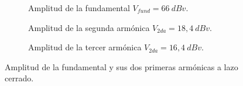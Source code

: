       \begin{figure}[H]
        \centering
        \begin{subfigure}[H]{0.48\textwidth}
          \caption{Amplitud de la fundamental $V_{fund}=66~dBv$.}
          \label{fig:Exp7AmpFundamentalLC}
        \end{subfigure}
        \hfill 
        \begin{subfigure}[H]{0.48\textwidth}
          \caption{Amplitud de la segunda armónica $V_{2da}=18,4~dBv$.}
          \label{fig:Exp7AmpSegundaLC}
        \end{subfigure}     
        \begin{subfigure}[H]{0.48\textwidth}
          \caption{Amplitud de la tercer armónica $V_{2da}=16,4~dBv$.}
          \label{fig:Exp7AmpTercerLC}
        \end{subfigure}   
        \caption{Amplitud de la fundamental y sus dos primeras armónicas a lazo cerrado.}
        \label{fig:Exp7AmplFundYArmonicasLC}
      \end{figure}    

